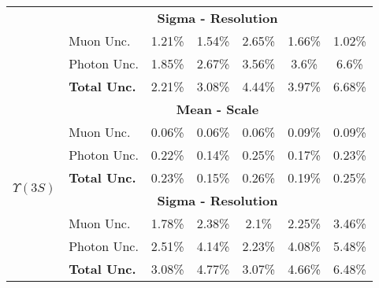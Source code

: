 \begin{tabular}{cl|c|c|c|c|c|}
\multicolumn{1}{|c|}{}                    & \multicolumn{6}{c|}{\textbf{Sigma - Resolution}}            \\ \cline{2-7}
\multicolumn{1}{|c|}{}                    & Muon Unc.           & 1.21\% & 1.54\% & 2.65\% & 1.66\% & 1.02\% \\ \cline{2-7}
\multicolumn{1}{|c|}{}                    & Photon Unc.         & 1.85\% & 2.67\% & 3.56\% & 3.6\% & 6.6\% \\ \cline{2-7}
\multicolumn{1}{|c|}{}                    & \textbf{Total Unc.} & 2.21\% & 3.08\% & 4.44\% & 3.97\% & 6.68\% \\ \hline \hline 



\multicolumn{1}{|c|}{\multirow{8}{*}{$\Upsilon(3S)$}} & \multicolumn{6}{c|}{\textbf{Mean - Scale}}  \\ \cline{2-7}
\multicolumn{1}{|c|}{}                    & Muon Unc.           & 0.06\% & 0.06\% & 0.06\% & 0.09\% & 0.09\% \\ \cline{2-7}
\multicolumn{1}{|c|}{}                    & Photon Unc.         & 0.22\% & 0.14\% & 0.25\% & 0.17\% & 0.23\% \\ \cline{2-7}
\multicolumn{1}{|c|}{}                    & \textbf{Total Unc.} & 0.23\% & 0.15\% & 0.26\% & 0.19\% & 0.25\% \\ \cline{2-7} 


\multicolumn{1}{|c|}{}                    & \multicolumn{6}{c|}{\textbf{Sigma - Resolution}}            \\ \cline{2-7}
\multicolumn{1}{|c|}{}                    & Muon Unc.           & 1.78\% & 2.38\% & 2.1\% & 2.25\% & 3.46\% \\ \cline{2-7}
\multicolumn{1}{|c|}{}                    & Photon Unc.         & 2.51\% & 4.14\% & 2.23\% & 4.08\% & 5.48\% \\ \cline{2-7}
\multicolumn{1}{|c|}{}                    & \textbf{Total Unc.} & 3.08\% & 4.77\% & 3.07\% & 4.66\% & 6.48\% \\ \hline \hline 
\end{tabular}
